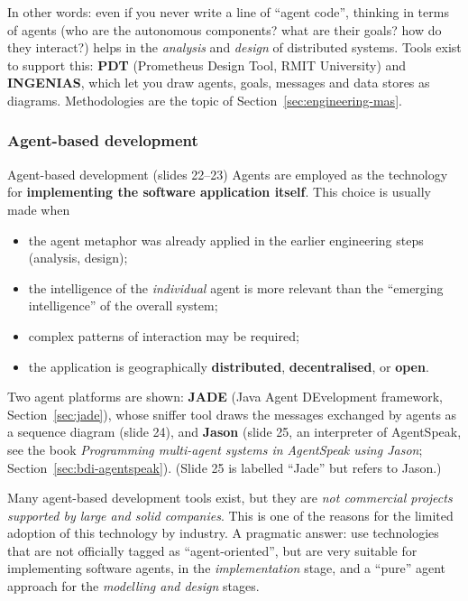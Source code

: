 In other words: even if you never write a line of ``agent code'', thinking in terms of
agents (who are the autonomous components? what are their goals? how do they interact?)
helps in the \emph{analysis} and \emph{design} of distributed systems. Tools exist to support
this: \textbf{PDT} (Prometheus Design Tool, RMIT University) and \textbf{INGENIAS}, which
let you draw agents, goals, messages and data stores as diagrams. Methodologies are the
topic of Section~\ref{sec:engineering-mas}.

\subsubsection{Agent-based development}

\begin{nbdef}{Agent-based development (slides 22--23)}
Agents are employed as the technology for \textbf{implementing the software application
itself}. This choice is usually made when
\begin{itemize}[nosep]
  \item the agent metaphor was already applied in the earlier engineering steps (analysis,
        design);
  \item the intelligence of the \emph{individual} agent is more relevant than the
        ``emerging intelligence'' of the overall system;
  \item complex patterns of interaction may be required;
  \item the application is geographically \textbf{distributed}, \textbf{decentralised}, or
        \textbf{open}.
\end{itemize}
\end{nbdef}

Two agent platforms are shown: \textbf{JADE} (Java Agent DEvelopment framework,
Section~\ref{sec:jade}), whose sniffer tool draws the messages exchanged by agents as a
sequence diagram (slide 24), and \textbf{Jason} (slide 25, an interpreter of AgentSpeak, see
the book \emph{Programming multi-agent systems in AgentSpeak using Jason};
Section~\ref{sec:bdi-agentspeak}). (Slide 25 is labelled ``Jade'' but refers to Jason.)

\begin{nbwarning}
Many agent-based development tools exist, but they are \emph{not commercial projects
supported by large and solid companies}. This is one of the reasons for the limited adoption
of this technology by industry. A pragmatic answer: use technologies that are not
officially tagged as ``agent-oriented'', but are very suitable for implementing software
agents, in the \emph{implementation} stage, and a ``pure'' agent approach for the
\emph{modelling and design} stages.
\end{nbwarning}

